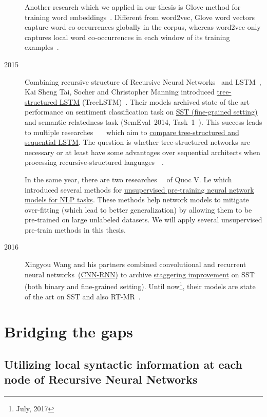 \begin{description}
Another research which we applied in our thesis is Glove method for training word embeddings~\cite{glove}.
Different from word2vec, Glove word vectors capture word co-occurrences globally in the corpus, whereas word2vec only captures local word co-occurrences in each window of its training examples~\cite{glove}.

\item [2015] Combining recursive structure of Recursive Neural Networks~\cite{socher2013recursive} and LSTM~\cite{originLSTM}, Kai Sheng Tai, Socher and Christopher Manning introduced \hyperref[sec:treelstm]{tree-structured LSTM}  (TreeLSTM)~\cite{treeLSTM}.
Their models archived state of the art performance on sentiment classification task on \hyperref[sec:sst]{SST (fine-grained setting)} and semantic relatedness task (SemEval~2014, Task~1~\cite{SemeEvalTask1}).
This success leads to multiple researches~\cite{need-tree}~\cite{bowman-treevslstm}~\cite{Graves_Nature2016} which aim to \hyperref[treelstm-advantage]{compare tree-structured and sequential LSTM}.
The question is whether tree-structured networks are necessary or at least have some advantages over sequential architects when processing recursive-structured languages~\cite{need-tree}~\cite{bowman-treevslstm}.

In the same year, there are two researches~\cite{ParagraphVec}~\cite{semisup-seq2seq} of Quoc V. Le which introduced several methods for \hyperref[sec:unsupervised-pretrain]{unsupervised pre-training neural network models for NLP tasks}.
These methods help network models to mitigate over-fitting (which lead to better generalization) by allowing them to be pre-trained on large unlabeled datasets.
We will apply several unsupervised pre-train methods in this thesis.

\item [2016] Xingyou Wang and his partners combined convolutional and recurrent neural networks~\hyperref[cnn-rnn]{(CNN-RNN)} to archive \hyperref[table:cnn-rnn]{staggering improvement} on SST (both binary and fine-grained setting).
Until now\footnote{July, 2017}, their models are state of the art on SST and also RT-MR~\cite{cnn-rnn}.
\end{description}

\section{Bridging the gaps}
\subsection{Utilizing local syntactic information at each node of Recursive Neural Networks}
